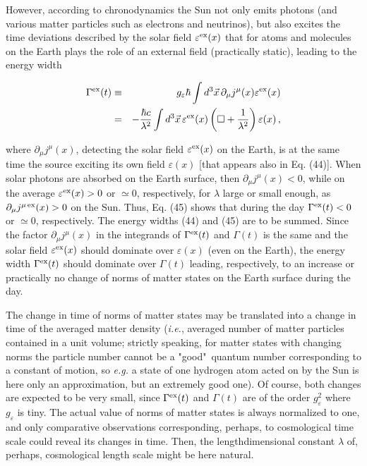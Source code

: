 \documentclass[a4paper,12pt]{article}
\begin{document}
However, according to chronodynamics the Sun not only emits photons (and various matter particles such as electrons and neutrinos), but also excites the time deviations described by the solar field $\varepsilon^{\rm ex}(x)$ that for atoms and molecules on the Earth plays the role of an external field (practically static), leading to the energy width

\begin{eqnarray}
\Gamma^{\rm ex}(t) & \equiv & g_\varepsilon \hbar \int d^3\vec{x}\, \partial_\mu j^\mu(x) \varepsilon^{\rm ex}(x) \nonumber \\ & = & - \frac{\hbar c}{\lambda^2} \int d^3\vec{x}\, \varepsilon^{\rm ex}(x) \left(\Box + \frac{1}{\lambda^2}\right) \varepsilon(x) \,,
\end{eqnarray} 

\vspace{0.1cm}

\ni where $\partial_\mu j^\mu(x)$, detecting the solar field $\varepsilon^{\rm ex}(x)$ on the Earth, is at the same time the source exciting its own field $\varepsilon(x)$ [that appears also in Eq. (44)]. When solar photons are ab\-sorbed on the Earth surface, then $\partial_\mu j^\mu(x) <0$, while on the average $\varepsilon^{\rm ex}(x) >0$ or $\simeq 0$, respectively, for $\lambda$ large or small enough, as $\partial_\mu j^{\mu\,{\rm ex}}(x) > 0$ on the Sun. Thus, Eq. (45) shows that during the day $\Gamma^{\rm ex}(t) < 0$ or $\simeq 0$, respectively. The energy widths (44) and (45) are to be summed. Since the factor $\partial_\mu j^\mu(x)$ in the integrands of $\Gamma^{\rm ex}(t)$ and $\Gamma(t)$ is the same and the solar field $\varepsilon^{\rm ex}(x)$ should dominate over $\varepsilon(x)$ (even on the Earth), the energy width $\Gamma^{\rm ex}(t)$ should dominate over $\Gamma(t)$ leading, respectively, to an increase or practically no change of norms of matter states on the Earth surface during the day.

The change in time of norms of matter states may be translated into a change in time of the averaged matter density ({\it i.e.}, averaged number of matter particles contained in a unit volume; strictly speaking, for matter states with changing norms the particle number cannot be a "good"\, quantum number corresponding to a constant of motion, so {\it e.g.} a state of one hydrogen atom acted on by the Sun is here only an approximation, but an extremely good one). Of course, both changes are expected to be very small, since $\Gamma^{\rm ex}(t)$ and $\Gamma(t)$ are of the order $ g^2_\varepsilon$ where $ g_\varepsilon$ is tiny. The actual value of norms of matter states is always normalized to one, and only comparative observations corresponding, perhaps, to cosmological time scale could reveal its changes in time. Then, the lengthdimensional constant $\lambda $ of, perhaps, cosmological length scale might be here natural.
\end{document}
